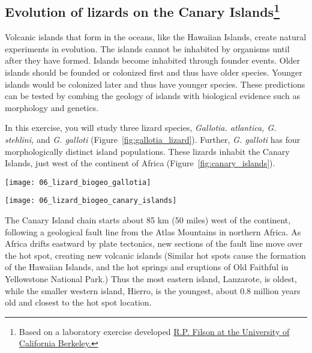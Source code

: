\documentclass[12pt, hidelinks]{exam}
\begin{document}
\subsection*{Evolution of lizards on the Canary Islands\footnote{Based on a laboratory exercise developed \href{https://www.ucmp.berkeley.edu/forsrec/Filson.html}{R.P. Filson at the University of California Berkeley.}}}

Volcanic islands that form in the oceans, like the Hawaiian Islands, create natural experiments in evolution. The islands cannot be inhabited by organisms until after they have formed. Islands become inhabited through founder events. Older islands should be founded or colonized first and thus have older species. Younger islands would be colonized later and thus have younger species. These predictions can be tested by combing the geology of islands with biological evidence such as morphology and genetics.

In this exercise, you will study three lizard species, \textit{Gallotia. atlantica, G. stehlini,} and \textit{G. galloti} (Figure~\ref{fig:gallotia_lizard}). Further, \textit{G. galloti} has four morphologically distinct island populations. These lizards inhabit the Canary Islands, just west of the continent of Africa (Figure~\ref{fig:canary_islands}).

\begin{multicols}{2}

	\begin{center}
		\texttt{[image: 06\_lizard\_biogeo\_gallotia]}
		
	\end{center}
\columnbreak
	
	\begin{center}
	
		\texttt{[image: 06\_lizard\_biogeo\_canary\_islands]}
	
	\end{center}
\end{multicols}

The Canary Island chain starts
about 85 km (50 miles) west of the continent, following a geological fault line from
the Atlas Mountains in northern Africa. As Africa drifts eastward by plate tectonics, 
new sections of the fault line move over the hot spot, creating new volcanic islands
 (Similar hot spots cause the formation of the Hawaiian Islands, and the hot springs and eruptions of Old Faithful in Yellowstone National Park.) Thus
the most eastern island, Lanzarote, is oldest, while the smaller western
island, Hierro, is the youngest, about 0.8 million years old and closest to the hot spot location.
\end{document}
